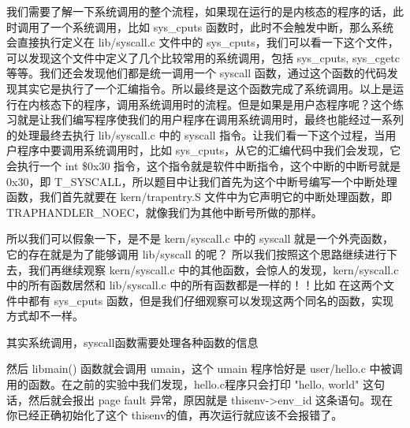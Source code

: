 \begin{ExerciseList}

  我们需要了解一下系统调用的整个流程，如果现在运行的是内核态的程序的话，此时调用了一个系统调用，比如 sys\_cputs 函数时，此时不会触发中断，那么系统会直接执行定义在 lib/syscall.c 文件中的 sys\_cputs，我们可以看一下这个文件，可以发现这个文件中定义了几个比较常用的系统调用，包括 sys\_cputs, sys\_cgetc 等等。我们还会发现他们都是统一调用一个 syscall 函数，通过这个函数的代码发现其实它是执行了一个汇编指令。所以最终是这个函数完成了系统调用。以上是运行在内核态下的程序，调用系统调用时的流程。但是如果是用户态程序呢？这个练习就是让我们编写程序使我们的用户程序在调用系统调用时，最终也能经过一系列的处理最终去执行 lib/syscall.c 中的 syscall 指令。让我们看一下这个过程，当用户程序中要调用系统调用时，比如 sys\_cputs，从它的汇编代码中我们会发现，它会执行一个 int \$0x30 指令，这个指令就是软件中断指令，这个中断的中断号就是 0x30，即 T\_SYSCALL，所以题目中让我们首先为这个中断号编写一个中断处理函数，我们首先就要在 kern/trapentry.S 文件中为它声明它的中断处理函数，即TRAPHANDLER\_NOEC，就像我们为其他中断号所做的那样。

  所以我们可以假象一下，是不是 kern/syscall.c 中的 syscall 就是一个外壳函数，它的存在就是为了能够调用 lib/syscall 的呢？ 所以我们按照这个思路继续进行下去，我们再继续观察 kern/syscall.c 中的其他函数，会惊人的发现，kern/syscall.c 中的所有函数居然和 lib/syscall.c 中的所有函数都是一样的！！比如 在这两个文件中都有 sys\_cputs 函数，但是我们仔细观察可以发现这两个同名的函数，实现方式却不一样。

  其实系统调用，syscall函数需要处理各种函数的信息


  然后 libmain() 函数就会调用 umain，这个 umain 程序恰好是 user/hello.c 中被调用的函数。在之前的实验中我们发现，hello.c程序只会打印 "hello, world" 这句话，然后就会报出 page fault 异常，原因就是 thisenv->env\_id 这条语句。现在你已经正确初始化了这个 thisenv的值，再次运行就应该不会报错了。


\end{ExerciseList}
